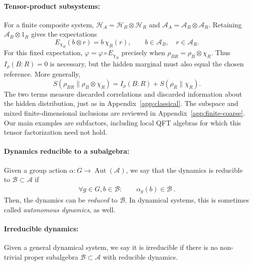 \documentclass[a4paper,11pt]{article}
\theoremstyle{definition}
\newcommand{\mA}{\mathcal{A}}
\newcommand{\mB}{\mathcal{B}}
\newcommand{\mH}{\mathcal{H}}
\begin{document}
\paragraph{Tensor-product subsystems:}
For a finite composite system, $\mH_A=\mH_B\otimes\mH_R$ and
$\mA_A=\mA_B\otimes\mA_R$. Retaining $\mA_B\otimes1_R$ gives the expectations
\begin{equation}\label{condexp}
 E_{\chi_R}(b\otimes r)=b\,\chi_R(r),
 \qquad b\in\mA_B,\quad r\in\mA_R.
\end{equation}
For this fixed expectation, $\varphi=\varphi\circ E_{\chi_R}$ precisely when
$\rho_{BR}=\rho_B\otimes\chi_R$. Thus $I_\rho(B:R)=0$ is necessary, but the hidden
marginal must also equal the chosen reference. More generally,
\begin{equation}\label{eq:quantum-coarse-entropy-decomposition}
 S(\rho_{BR}\|\rho_B\otimes\chi_R)
 =I_\rho(B:R)+S(\rho_R\|\chi_R).
\end{equation}
The two terms measure discarded correlations and discarded information about the
hidden distribution, just as in Appendix~\ref{app:classical}.
The subspace and mixed finite-dimensional inclusions are reviewed in
Appendix~\ref{app:finite-coarse}. Our main examples are subfactors, including
local QFT algebras for which this tensor factorization need not hold.

\paragraph{Dynamics reducible to a subalgebra:} Given a group action $\alpha:G\to\operatorname{Aut}(\mA)$, we say that the dynamics is reducible to $\mB\subset\mA$ if 
\begin{align}
    \forall g\in G,b\in\mB:\qquad \alpha_g(b)\in \mB\ . 
\end{align}
Then, the dynamics can be {\it reduced} to $\mB$. In dynamical systems, this is sometimes called {\it autonomous dynamics}, as well.

\paragraph{Irreducible dynamics:} Given a general dynamical system, we say it is irreducible if there is no non-trivial proper subalgebra $\mB\subset \mA$ with reducible dynamics.
\end{document}
